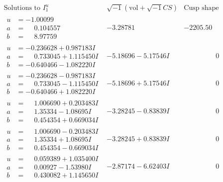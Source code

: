 \documentclass[1p]{elsarticle_modified}
\theoremstyle{definition}
\newcommand{\I}{\sqrt{-1}}
\begin{document}
$$\begin{array}{c|c|c}  
\text{Solutions to }I^u_{1}& \I (\text{vol} + \sqrt{-1}CS) & \text{Cusp shape}\\
 \hline 
\begin{aligned}
u &= -1.00099\phantom{ +0.000000I} \\
a &= \phantom{-}0.104557\phantom{ +0.000000I} \\
b &= \phantom{-}8.97759\phantom{ +0.000000I}\end{aligned}
 & -3.28781\phantom{ +0.000000I} & -2205.50\phantom{ +0.000000I} \\ \hline\begin{aligned}
u &= -0.236628 + 0.987183 I \\
a &= \phantom{-}0.733045 + 1.115450 I \\
b &= -0.640466 - 1.082220 I\end{aligned}
 & -5.18696 - 5.17546 I & \phantom{-0.000000 } 0 \\ \hline\begin{aligned}
u &= -0.236628 - 0.987183 I \\
a &= \phantom{-}0.733045 - 1.115450 I \\
b &= -0.640466 + 1.082220 I\end{aligned}
 & -5.18696 + 5.17546 I & \phantom{-0.000000 } 0 \\ \hline\begin{aligned}
u &= \phantom{-}1.006690 + 0.203483 I \\
a &= \phantom{-}1.35334 - 1.08695 I \\
b &= \phantom{-}0.454354 + 0.669034 I\end{aligned}
 & -3.28245 - 0.83839 I & \phantom{-0.000000 } 0 \\ \hline\begin{aligned}
u &= \phantom{-}1.006690 - 0.203483 I \\
a &= \phantom{-}1.35334 + 1.08695 I \\
b &= \phantom{-}0.454354 - 0.669034 I\end{aligned}
 & -3.28245 + 0.83839 I & \phantom{-0.000000 } 0 \\ \hline\begin{aligned}
u &= \phantom{-}0.059389 + 1.035400 I \\
a &= \phantom{-}0.00927 - 1.53980 I \\
b &= \phantom{-}0.430082 + 1.145650 I\end{aligned}
 & -2.87174 - 6.62403 I & \phantom{-0.000000 } 0 \\ \hline\begin{aligned}

\end{aligned}
\end{array}$$
\end{document}
